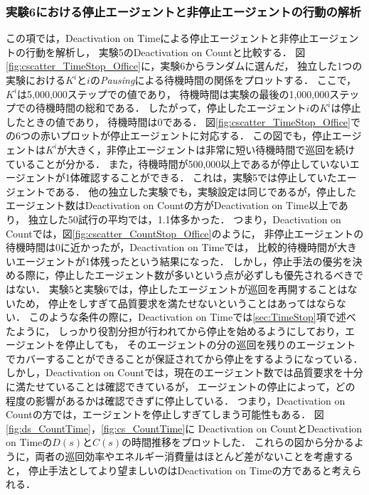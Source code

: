 \documentclass[12pt,a4j,twoside]{jarticle}
\begin{document}
  \subsubsection{実験6における停止エージェントと非停止エージェントの行動の解析}\label{sec:ex6Analsis}
  この項では，Deactivation on Timeによる停止エージェントと非停止エージェントの行動を解析し，
  実験5のDeactivation on Countと比較する．
  図\ref{fig:cscatter_TimeStop_Office}に，実験6からランダムに選んだ，
  独立した1つの実験における$K^i$と$i$の{\em Pausing}による待機時間の関係をプロットする．
  ここで，$K^i$は5,000,000ステップでの値であり，
  待機時間は実験の最後の1,000,000ステップでの待機時間の総和である．
  したがって，停止したエージェント$i$の$K^i$は停止したときの値であり，
  待機時間は0である．
  図\ref{fig:cscatter_TimeStop_Office}での6つの赤いプロットが停止エージェントに対応する．
  この図でも，停止エージェントは$K^i$が大きく，非停止エージェントは非常に短い待機時間で巡回を続けていることが分かる．
  また，待機時間が500,000以上であるが停止していないエージェントが1体確認することができる．
  これは，実験5では停止していたエージェントである．
  他の独立した実験でも，実験設定は同じであるが，停止したエージェント数はDeactivation on Countの方がDeactivation on Time以上であり，
  独立した50試行の平均では，1.1体多かった．
  つまり，Deactivation on Countでは，図\ref{fig:cscatter_CountStop_Office}のように，
  非停止エージェントの待機時間は0に近かったが，Deactivation on Timeでは，
  比較的待機時間が大きいエージェントが1体残ったという結果になった．
  しかし，停止手法の優劣を決める際に，停止したエージェント数が多いという点が必ずしも優先されるべきではない．
  実験5と実験6では，停止したエージェントが巡回を再開することはないため，
  停止をしすぎて品質要求を満たせないということはあってはならない．
  このような条件の際に，Deactivation on Timeでは\ref{sec:TimeStop}項で述べたように，
  しっかり役割分担が行われてから停止を始めるようにしており，エージェントを停止しても，
  そのエージェントの分の巡回を残りのエージェントでカバーすることができることが保証されてから停止をするようになっている．
  しかし，Deactivation on Countでは，現在のエージェント数では品質要求を十分に満たせていることは確認できているが，
  エージェントの停止によって，どの程度の影響があるかは確認できずに停止している．
  つまり，Deactivation on Countの方では，エージェントを停止しすぎてしまう可能性もある．
  図\ref{fig:ds_CountTime}，\ref{fig:cs_CountTime}に
  Deactivation on CountとDeactivation on Timeの$D(s)$と$C(s)$の時間推移をプロットした．
  これらの図から分かるように，両者の巡回効率やエネルギー消費量はほとんど差がないことを考慮すると，
  停止手法としてより望ましいのはDeactivation on Timeの方であると考えられる．
  \par
\end{document}
